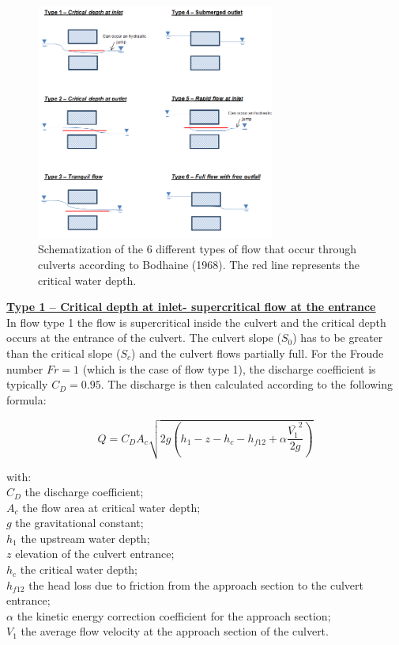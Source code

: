 \begin{figure}[H]
\begin{center}
  \includegraphics[width=0.7\textwidth]{culvert_fig3.png}
\end{center}
\caption{Schematization of the 6 different types of flow that occur
through culverts according to Bodhaine (1968).
The red line represents the critical water depth.}
\label{fig:culvert_fig3}
\end{figure}

\underline{\textbf{Type 1 -- Critical depth at inlet- supercritical flow at the entrance}}\\

In flow type 1 the flow is supercritical inside the culvert and the critical depth occurs
at the entrance of the culvert. The culvert slope ($S_0$) has to be greater than the
critical slope ($S_c$) and the culvert flows partially full.
For the Froude number $Fr=1$ (which is the case of flow type 1),
the discharge coefficient is typically $C_D=0.95$.
The discharge is then calculated according to the following formula:

\begin{equation}
Q = C_D A_c \sqrt{2g\left(h_1-z-h_c-h_{f12}+\alpha \dfrac{\overline{V_1}^2}{2g}\right)}
\end{equation}

with:\\
$C_D$ the discharge coefficient;\\
$A_c$ the flow area at critical water depth; \\
$g$ the gravitational constant; \\
$h_1$ the upstream water depth; \\
$z$ elevation of the culvert entrance; \\
$h_c$ the critical water depth; \\
$h_{f12}$ the head loss due to friction from the approach section to the culvert entrance; \\
$\alpha$ the kinetic energy correction coefficient for the approach section; \\
$V_1$ the average flow velocity at the approach section of the culvert.\\

